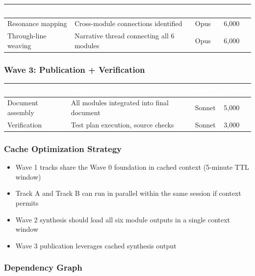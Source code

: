 \documentclass[11pt,letterpaper]{article}
\newcommand{\tableheader}[1]{\textbf{\sffamily\textcolor{white}{#1}}}
\begin{document}
\begin{center}
\begin{tabularx}{\textwidth}{L{3cm}XC{1.5cm}C{2cm}}
\toprule
{}
\tableheader{Task} & \tableheader{Output} & \tableheader{Model} & \tableheader{Tokens} \\
\midrule
Resonance mapping & Cross-module connections identified & Opus & 6,000 \\
Through-line weaving & Narrative thread connecting all 6 modules & Opus & 6,000 \\
\bottomrule
\end{tabularx}
\end{center}

\subsubsection{Wave 3: Publication + Verification}

\begin{center}
\begin{tabularx}{\textwidth}{L{3cm}XC{1.5cm}C{2cm}}
\toprule
{}
\tableheader{Task} & \tableheader{Output} & \tableheader{Model} & \tableheader{Tokens} \\
\midrule
Document assembly & All modules integrated into final document & Sonnet & 5,000 \\
Verification & Test plan execution, source checks & Sonnet & 3,000 \\
\bottomrule
\end{tabularx}
\end{center}

\subsubsection{Cache Optimization Strategy}
\begin{itemize}[leftmargin=2em]
\item Wave 1 tracks share the Wave 0 foundation in cached context (5-minute TTL window)
\item Track A and Track B can run in parallel within the same session if context permits
\item Wave 2 synthesis should load all six module outputs in a single context window
\item Wave 3 publication leverages cached synthesis output
\end{itemize}

\subsubsection{Dependency Graph}
\end{document}
